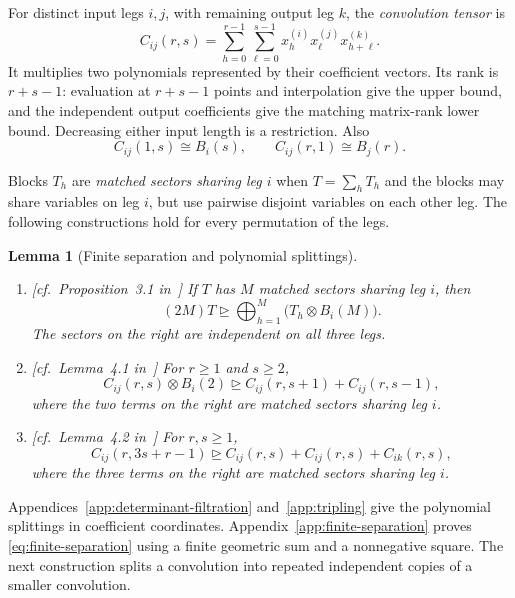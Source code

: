 \documentclass[11pt]{article}
\newtheorem{lemma}[theorem]{Lemma}
\newcommand{\degen}{\unrhd}
\begin{document}
For distinct input legs $i,j$, with remaining output leg $k$, the
\emph{convolution tensor} is
\[
 C_{ij}(r,s)=\sum_{h=0}^{r-1}\sum_{\ell=0}^{s-1}
 x_h^{(i)}x_\ell^{(j)}x_{h+\ell}^{(k)}.
\]
It multiplies two polynomials represented by their coefficient vectors.
Its rank is $r+s-1$: evaluation at $r+s-1$ points and interpolation
give the upper bound, and the independent output coefficients give the
matching matrix-rank lower bound. Decreasing either input length is a
restriction. Also
\begin{equation}\label{eq:boundary-convolutions}
 C_{ij}(1,s)\cong B_i(s),\qquad C_{ij}(r,1)\cong B_j(r).
\end{equation}

Blocks $T_h$ are \emph{matched sectors sharing leg $i$} when
$T=\sum_h T_h$ and the blocks may share variables on leg $i$, but use
pairwise disjoint variables on each other leg. The following constructions
hold for every permutation of the legs.

\begin{lemma}[Finite separation and polynomial splittings]\label{lem:openai-inputs}
\leavevmode
\begin{enumerate}
\item \textup{[cf.\ Proposition~3.1 in~\cite{openai-2026-matrix-nine-fourths}]}
If $T$ has $M$ matched sectors sharing leg $i$, then
\begin{equation}\label{eq:finite-separation}
 (2M)T\degen\bigoplus_{h=1}^M\bigl(T_h\otimes B_i(M)\bigr).
\end{equation}
The sectors on the right are independent on all three legs.
\item \textup{[cf.\ Lemma~4.1 in~\cite{openai-2026-matrix-nine-fourths}]}
For $r\ge1$ and $s\ge2$,
\[
 C_{ij}(r,s)\otimes B_i(2)
 \degen C_{ij}(r,s+1)+C_{ij}(r,s-1),
\]
where the two terms on the right are matched sectors sharing leg $i$.
\item \textup{[cf.\ Lemma~4.2 in~\cite{openai-2026-matrix-nine-fourths}]}
For $r,s\ge1$,
\[
 C_{ij}(r,3s+r-1)
 \degen C_{ij}(r,s)+C_{ij}(r,s)+C_{ik}(r,s),
\]
where the three terms on the right are matched sectors sharing leg $i$.
\end{enumerate}
\end{lemma}

Appendices~\ref{app:determinant-filtration} and~\ref{app:tripling} give
the polynomial splittings in coefficient coordinates.
Appendix~\ref{app:finite-separation} proves
\eqref{eq:finite-separation} using a finite geometric sum and a nonnegative
square. The next construction splits a convolution into repeated
independent copies of a smaller convolution.
\end{document}
